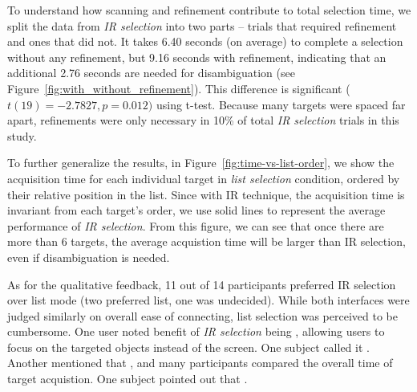 To understand how scanning and refinement contribute to total selection time, we split the data from {\em IR selection} into two parts -- trials that required refinement and ones that did not. It takes 6.40 seconds (on average) to complete  a selection without any refinement, but 9.16 seconds with refinement, indicating that an additional 2.76 seconds are needed for disambiguation (see Figure~\ref{fig:with_without_refinement}). This difference is significant ($t(19)=-2.7827, p=0.012)$ using t-test.
Because many targets were spaced far apart, refinements were only necessary in 10\% of total {\em IR selection} trials in this study.

To further generalize the results, in Figure~\ref{fig:time-vs-list-order}, we show the acquisition time for each individual target in {\em list selection} condition, ordered by their relative position in the list. Since with IR technique, the acquisition time is invariant from each target's order, we use solid lines to represent the average performance of {\em IR selection}. From this figure, we can see that once there are more than 6 targets, the average acquistion time will be larger than IR selection, even if disambiguation is needed. %

As for the qualitative feedback, 11 out of 14 participants preferred IR selection over list mode (two preferred list, one was undecided). While both interfaces were judged similarly on overall ease of connecting, list selection was perceived to be cumbersome. One user noted benefit of {\em IR selection} being , allowing users to focus on the targeted objects instead of the screen. One subject called it . Another mentioned that , and many participants compared the overall time of target acquistion. One subject pointed out that .

